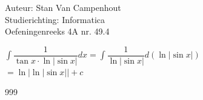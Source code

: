 \documentclass[a4paper]{article}
\begin{document}
  
\noindent \large Auteur: Stan Van Campenhout \\
\noindent \large Studierichting:  Informatica\\
\noindent \large Oefeningenreeks 4A nr. 49.4\\

\medskip

\normalsize

$ \displaystyle\int\dfrac{1}{\tan x\cdot\ln|\sin x|}dx = \displaystyle\int\dfrac{1}{\ln|\sin x|}d\left(\ln|\sin x|\right) $\\

$ = \ln|\ln|\sin x|| + c $\\

\begin{thebibliography}{999}
\end{thebibliography}
\end{document}
